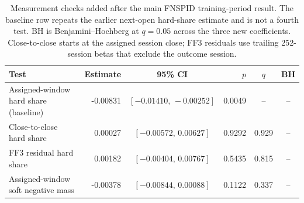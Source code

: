 \begin{table}[htbp]
\centering
\caption[Measurement sensitivities]{Measurement checks added after the main FNSPID training-period result. The baseline row repeats the earlier next-open hard-share estimate and is not a fourth test. BH is Benjamini--Hochberg at $q=0.05$ across the three new coefficients. Close-to-close starts at the assigned session close; FF3 residuals use trailing 252-session betas that exclude the outcome session.}
\label{tab:outcome-label-sensitivities}
\scriptsize
\begin{tabular}{@{}l d{-1.5} c d{1.4} c c@{}}
\toprule
Test & {Estimate} & {95\% CI} & {$p$} & {$q$} & {BH} \\
\midrule
Assigned-window hard share (baseline) & -0.00831 & $[-0.01410,\,-0.00252]$ & 0.0049 & -- & -- \\
Close-to-close hard share & 0.00027 & $[-0.00572,\,0.00627]$ & 0.9292 & 0.929 & -- \\
FF3 residual hard share & 0.00182 & $[-0.00404,\,0.00767]$ & 0.5435 & 0.815 & -- \\
Assigned-window soft negative mass & -0.00378 & $[-0.00844,\,0.00088]$ & 0.1122 & 0.337 & -- \\
\bottomrule
\end{tabular}
\end{table}
